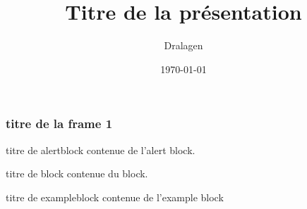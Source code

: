 \documentclass{beamer}
\title{Titre de la présentation}
\author{Dralagen}
\date{\today}
\begin{document}
\begin{frame}
	\maketitle
\end{frame}

\begin{frame}
  \frametitle{titre de la frame 1}
	\begin{alertblock}{titre de alertblock}
    contenue de l'alert block.
  \end{alertblock}
  \begin{block}{titre de block}
     contenue du block.
  \end{block}
  \begin{exampleblock}{titre de exampleblock}
    contenue de l'example block
  \end{exampleblock}
\end{frame}
\end{document}
